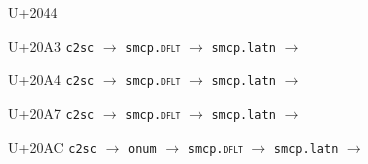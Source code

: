\documentclass{article}
\begin{document}
\clearpage

\begin{substitutions}

U+2044  \linebreak
    

\goodbreak

\end{substitutions}

\clearpage

\begin{substitutions}

U+20A3  \linebreak
    \texttt{c2sc} $\to$  \linebreak
    \texttt{smcp.\textsc{dflt}} $\to$  \linebreak
    \texttt{smcp.latn} $\to$  

\goodbreak

U+20A4  \linebreak
    \texttt{c2sc} $\to$  \linebreak
    \texttt{smcp.\textsc{dflt}} $\to$  \linebreak
    \texttt{smcp.latn} $\to$  

\goodbreak

U+20A7  \linebreak
    \texttt{c2sc} $\to$  \linebreak
    \texttt{smcp.\textsc{dflt}} $\to$  \linebreak
    \texttt{smcp.latn} $\to$  

\goodbreak

U+20AC  \linebreak
    \texttt{c2sc} $\to$  \linebreak
    \texttt{onum} $\to$  \linebreak
    \texttt{smcp.\textsc{dflt}} $\to$  \linebreak
    \texttt{smcp.latn} $\to$  

\goodbreak

\end{substitutions}

\clearpage
\end{document}
